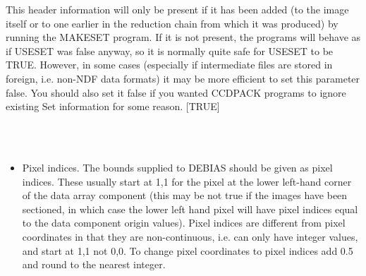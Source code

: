 \documentclass[twoside,11pt]{article}
\newcommand{\htmlref}[2]{#1}
\renewcommand{\_}{\texttt{\symbol{95}}}
\newcommand{\xroutine}[1]{\htmlref{{\sc #1}}{#1}}
\newcommand{\sstnotes}[1]{\item[Notes:] \mbox{} \\[1.3ex] #1}
\newcommand{\sstitemlist}[1]{
  \mbox{} \\
  \vspace{-3.5ex}
  \begin{itemize}
     #1
  \end{itemize}
}
\newcommand{\sstitem}{\item}
\newcommand{\sstnotes}[1]{\item[Notes:] #1 }
\newcommand{\sstitemlist}[1]{
      \begin{itemize}
         #1
      \end{itemize}
      \\
   }
\newcommand{\sstitem}{\item}
\begin{document}
{{{         This header information will only be present if it has been
         added (to the image itself or to one earlier in the reduction 
         chain from which it was produced) by running the \xroutine{MAKESET}
         program.  If it is not present, the programs will behave
         as if USESET was false anyway, so it is normally quite safe
         for USESET to be TRUE.  However, in some cases (especially
         if intermediate files are stored in foreign, i.e. non-NDF 
         data formats) it may be more efficient to set this parameter
         false.  You should also set it false if you wanted CCDPACK
         programs to ignore existing Set information for some reason.
         [TRUE]
      }
   }
   \sstnotes{
      \sstitemlist{

         \sstitem
         Pixel indices. The bounds supplied to \xroutine{DEBIAS} should be given as
           pixel indices. These usually start at 1,1 for the pixel at the
           lower left-hand corner of the data array component (this may
           be not true if the images have been sectioned, in which case the
           lower left hand pixel will have pixel indices equal to the data
           component origin values). Pixel indices are different from
           pixel coordinates in that they are non-continuous, i.e. can
           only have integer values, and start at 1,1 not 0,0. To change
           pixel coordinates to pixel indices add 0.5 and round to the
           nearest integer.

}}}
\end{document}
